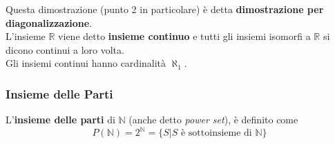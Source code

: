 Questa dimostrazione (punto 2 in particolare) è detta \textbf{dimostrazione per diagonalizzazione}.\\

L'insieme $\mathbb{R}$ viene detto \textbf{insieme continuo} e tutti gli insiemi isomorfi a $\mathbb{R}$ si dicono continui a loro volta.\\

Gli insiemi continui hanno cardinalità $\aleph_1$.\\

\subsubsection{Insieme delle Parti}
L'\textbf{insieme delle parti} di $\mathbb{N}$ (anche detto \textit{power set}), è definito come
$$ P(\mathbb{N}) = 2^{\mathbb{N}} = \{S | S \text{ è sottoinsieme di } \mathbb{N}\} $$

